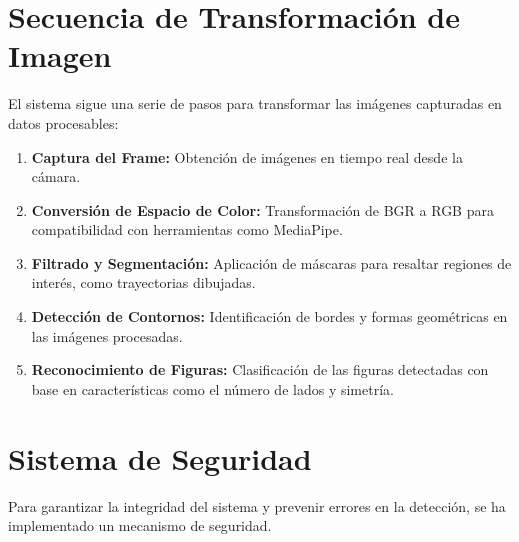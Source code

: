 \section{Secuencia de Transformación de Imagen}
El sistema sigue una serie de pasos para transformar las imágenes capturadas en datos procesables:
\begin{enumerate}
    \item \textbf{Captura del Frame:} Obtención de imágenes en tiempo real desde la cámara.
    \item \textbf{Conversión de Espacio de Color:} Transformación de BGR a RGB para compatibilidad con herramientas como MediaPipe.
    \item \textbf{Filtrado y Segmentación:} Aplicación de máscaras para resaltar regiones de interés, como trayectorias dibujadas.
    \item \textbf{Detección de Contornos:} Identificación de bordes y formas geométricas en las imágenes procesadas.
    \item \textbf{Reconocimiento de Figuras:} Clasificación de las figuras detectadas con base en características como el número de lados y simetría.
\end{enumerate}

\section{Sistema de Seguridad}
Para garantizar la integridad del sistema y prevenir errores en la detección, se ha implementado un mecanismo de seguridad.

